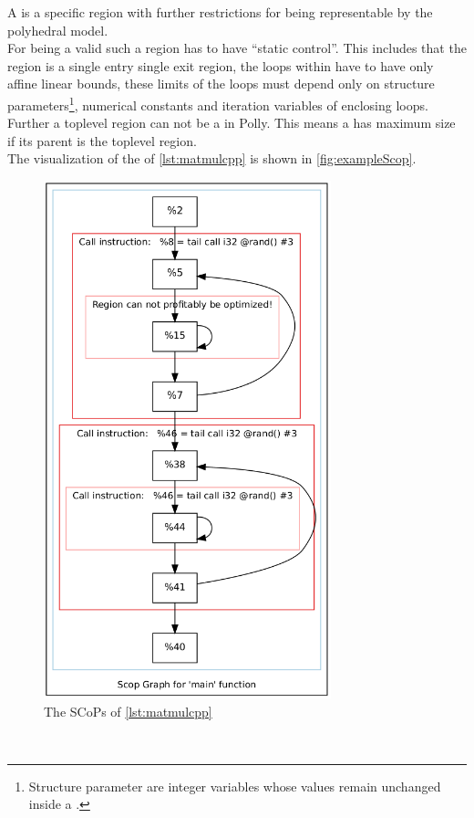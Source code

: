 A \scop is a specific region with further restrictions for being representable by the polyhedral model.\\
For being a valid \scop such a region has to have \enquote{static control}.
This includes that the region is a single entry single exit region, the loops within have to have only affine linear bounds, these limits of the loops must depend only on structure parameters\footnote{Structure parameter are integer variables whose values remain unchanged inside a \scop.}, numerical constants and iteration variables of enclosing loops. \cite{GanserIterativeSchedule, ScopDetection.cpp}
Further a toplevel region can not be a \scop in Polly. 
This means a \scop has maximum size if its parent is the toplevel region.\\
The visualization of the \scops of \autoref{lst:matmulcpp} is shown in \autoref{fig:exampleScop}.
\begin{figure}[!ht]
    \centering
    \caption{The SCoPs of \autoref{lst:matmulcpp}}
    \label{fig:exampleScop}
    \includegraphics[height=15cm]{gfx/matmulScops.png}
\end{figure}\\
